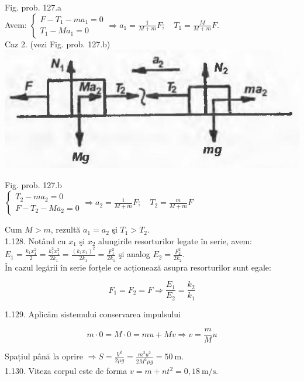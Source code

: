 \documentclass[10pt]{article}
\begin{document}
Fig. prob. 127.a\\
Avem: $\left\{\begin{array}{l}F-T_{1}-m a_{1}=0 \\ T_{1}-M a_{1}=0\end{array} \Rightarrow a_{1}=\frac{1}{M+m} F ; \quad T_{1}=\frac{M}{M+m} F\right.$.\\
Caz 2. (vezi Fig. prob. 127.b)\\
\includegraphics[max width=\textwidth, center]{2025_07_01_5b3ff9fa0d508c8e9f17g-225(2)}

Fig. prob. 127.b\\
$\left\{\begin{array}{l}T_{2}-m a_{2}=0 \\ F-T_{2}-M a_{2}=0\end{array} \Rightarrow a_{2}=\frac{1}{M+m} F ; \quad T_{2}=\frac{m}{M+m} F\right.$

Cum $M>m$, rezultă $a_{1}=a_{2}$ şi $T_{1}>T_{2}$.\\
1.128. Notând cu $x_{1}$ şi $x_{2}$ alungirile resorturilor legate în serie, avem:\\
$E_{1}=\frac{k_{1} x_{1}^{2}}{2}=\frac{k_{1}^{2} x_{1}^{2}}{2 k_{1}}=\frac{\left(k_{1} x_{1}\right)^{2}}{2 k_{1}}=\frac{F_{1}^{2}}{2 k_{1}}$ şi analog $E_{2}=\frac{F_{2}^{2}}{2 k_{2}}$.\\
În cazul legării în serie forțele ce acționează asupra resorturilor sunt egale:

$$
F_{1}=F_{2}=F \Rightarrow \frac{E_{1}}{E_{2}}=\frac{k_{2}}{k_{1}}
$$

1.129. Aplicăm sistemului conservarea impulsului

$$
m \cdot 0=M \cdot 0=m u+M v \Rightarrow v=\frac{m}{M} u
$$

Spațiul până la oprire $\Rightarrow S=\frac{V^{2}}{2 \mu g}=\frac{m^{2} u^{2}}{2 M^{2} \mu g}=50 \mathrm{~m}$.\\
1.130. Viteza corpul este de forma $v=m+n t^{2}=0,18 \mathrm{~m} / \mathrm{s}$.
\end{document}
